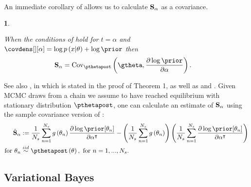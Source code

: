 \documentclass{article}\usepackage[]{graphicx}\usepackage[]{color}
\theoremstyle{plain}
\theoremstyle{definition}
\theoremstyle{plain}
\newtheorem{cor}[thm]{\protect\corollaryname}
\theoremstyle{plain}
\theoremstyle{plain}
\theoremstyle{plain}
\providecommand{\corollaryname}{Corollary}
\begin{document}
An immediate corollary of  allows us to calculate
$\mathbf{S}_{\alpha}$ as a  covariance.
\begin{cor}
\label{cor:sens_cov_prior}

When the conditions of  hold for $t=\alpha$
and $\covdens[][\alpha]=\log p\left(x\vert\theta\right)+\log\prior$
then
\begin{align}
\psens & =\cov_{\pthetapost}\left(\gtheta,\frac{\partial\log\prior}{\partial\alpha}\right).\label{eq:covariance_sensitivity}
\end{align}
\end{cor}

See also \citet{basu:1996:local}, in which 
is stated in the proof of Theorem 1, as well as \citet{perez:2006:mcmc}
and \citet{efron:2015:frequentist}. Given MCMC draws from a chain
we assume to have reached equilibrium with stationary distribution
$\pthetapost$, one can calculate an estimate of $\mathbf{S}_{\alpha}$ using the
sample covariance version of :
\begin{align}
\psenshat & :=\frac{1}{N_{s}}\sum_{n=1}^{N_{s}}g\left(\theta_{n}\right)\frac{\partial\log\prior[\theta_{n}]}{\partial\alpha^{\trans}}-\left(\frac{1}{N_{s}}\sum_{n=1}^{N_{s}}g\left(\theta_{n}\right)\right)\left(\frac{1}{N_{s}}\sum_{n=1}^{N_{s}}\frac{\partial\log\prior[\theta_{n}]}{\partial\alpha^{\trans}}\right)\label{eq:mcmc_sample_cov}\\
\textrm{for }\theta_{n} & \iid\pthetapost\left(\theta\right),\textrm{ for }n=1,...,N_{s}.\nonumber 
\end{align}

\subsection{Variational Bayes\label{subsec:variational_Bayes}}
\end{document}
